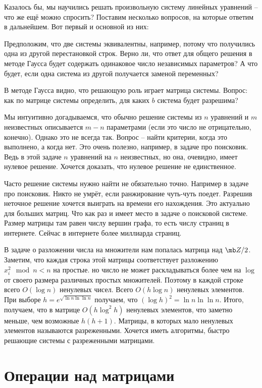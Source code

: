 Казалось бы, мы научились решать произвольную систему линейных уравнений -- что же ещё можно спросить? Поставим несколько вопросов, на которые ответим в дальнейшем. Вот первый и основной из них:
\enm
\item Предположим, что две системы эквивалентны, например, потому что получились одна из другой перестановкой строк. Верно ли, что ответ для общего решения в методе Гаусса будет содержать одинаковое число независимых параметров? А что будет, если одна система из другой получается заменой переменных?
\item В методе Гаусса видно, что решающую роль играет матрица системы. Вопрос: как по матрице системы определить, для каких $b$ система будет разрешима?
\item Мы интуитивно догадываемся, что обычно решение системы из $n$ уравнений и $m$ неизвестных описывается $m-n$ параметрами (если это число не отрицательно, конечно). Однако это не всегда так. Вопрос -- найти критерии, когда это выполнено, а когда нет. Это очень полезно, например, в задаче про поисковик. Ведь в этой задаче $n$ уравнений на $n$ неизвестных, но она, очевидно, имеет нулевое решение. Хочется доказать, что нулевое решение  не единственное.
\item Часто решение системы нужно найти не обязательно точно. Например в задаче про поисковик. Никто не умрёт, если ранжирование чуть-чуть поедет. Разрешив неточное решение хочется выиграть на времени его нахождения. Это актуально для больших матриц. Что как раз  и имеет место в задаче о поисковой системе. Размер матрицы там равен числу вершин графа, то есть числу страниц в интернете. Сейчас в интернете более миллиарда страниц.

\item В задаче о разложении числа на множители нам попалась матрица над $\mb Z/2$. Заметим, что каждая строка этой матрицы соответствует разложению $x_i^2 \mod n < n $ на простые. но число не может раскладываться более чем на $\log$ от своего размера различных простых множителей. Поэтому в каждой строке всего $O(\log n)$ ненулевых чисел.  Всего $O(h \log n )$ ненулевых элементов. При выборе $h=e^{\sqrt{\ln n \ln\ln n}}$ получаем, что $(\log h)^2 = \ln n \ln\ln n$. Итого, получаем, что в матрице  $O(h \log^2 h)$ ненулевых элементов, что заметно меньше, чем возможные $h(h+1)$. Матрицы, в которых мало ненулевых элементов называются разреженными. Хочется иметь алгоритмы, быстро решающие системы с разреженными матрицами.
\eenm


\section{Операции над матрицами}

